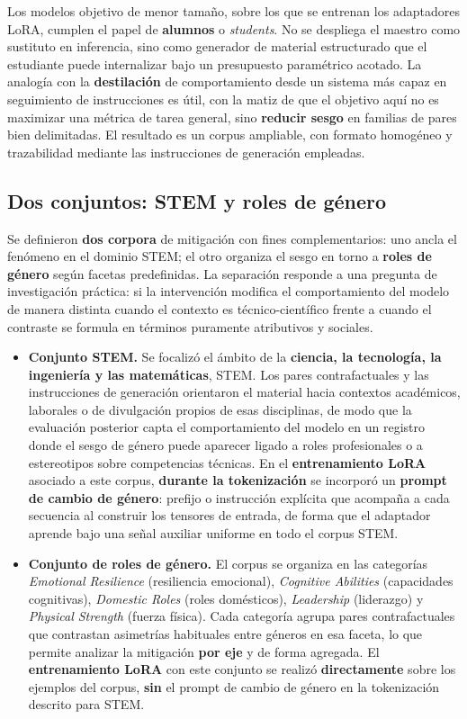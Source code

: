 \documentclass[12pt,a4paper]{report}
\begin{document}
Los modelos objetivo de menor tamaño, sobre los que se entrenan los adaptadores LoRA, cumplen el papel de \textbf{alumnos} o \textit{students}. No se despliega el maestro como sustituto en inferencia, sino como generador de material estructurado que el estudiante puede internalizar bajo un presupuesto paramétrico acotado. La analogía con la \textbf{destilación} de comportamiento desde un sistema más capaz en seguimiento de instrucciones es útil, con la matiz de que el objetivo aquí no es maximizar una métrica de tarea general, sino \textbf{reducir sesgo} en familias de pares bien delimitadas. El resultado es un corpus ampliable, con formato homogéneo y trazabilidad mediante las instrucciones de generación empleadas.

\subsection{Dos conjuntos: STEM y roles de género}

Se definieron \textbf{dos corpora} de mitigación con fines complementarios: uno ancla el fenómeno en el dominio STEM; el otro organiza el sesgo en torno a \textbf{roles de género} según facetas predefinidas. La separación responde a una pregunta de investigación práctica: si la intervención modifica el comportamiento del modelo de manera distinta cuando el contexto es técnico-científico frente a cuando el contraste se formula en términos puramente atributivos y sociales.

\begin{itemize}
    \item \textbf{Conjunto STEM.} Se focalizó el ámbito de la \textbf{ciencia, la tecnología, la ingeniería y las matemáticas}, STEM. Los pares contrafactuales y las instrucciones de generación orientaron el material hacia contextos académicos, laborales o de divulgación propios de esas disciplinas, de modo que la evaluación posterior capta el comportamiento del modelo en un registro donde el sesgo de género puede aparecer ligado a roles profesionales o a estereotipos sobre competencias técnicas. En el \textbf{entrenamiento LoRA} asociado a este corpus, \textbf{durante la tokenización} se incorporó un \textbf{prompt de cambio de género}: prefijo o instrucción explícita que acompaña a cada secuencia al construir los tensores de entrada, de forma que el adaptador aprende bajo una señal auxiliar uniforme en todo el corpus STEM.
    \item \textbf{Conjunto de roles de género.} El corpus se organiza en las categorías \textit{Emotional Resilience} (resiliencia emocional), \textit{Cognitive Abilities} (capacidades cognitivas), \textit{Domestic Roles} (roles domésticos), \textit{Leadership} (liderazgo) y \textit{Physical Strength} (fuerza física). Cada categoría agrupa pares contrafactuales que contrastan asimetrías habituales entre géneros en esa faceta, lo que permite analizar la mitigación \textbf{por eje} y de forma agregada. El \textbf{entrenamiento LoRA} con este conjunto se realizó \textbf{directamente} sobre los ejemplos del corpus, \textbf{sin} el prompt de cambio de género en la tokenización descrito para STEM.
\end{itemize}
\end{document}
